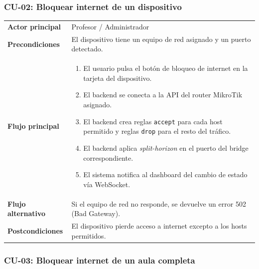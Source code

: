 \documentclass[12pt, a4paper, twoside]{article}
\begin{document}
\subsubsection{CU-02: Bloquear internet de un dispositivo}

\begin{tabularx}{\textwidth}{lX}
  \toprule
  \textbf{Actor principal} & Profesor / Administrador \\
  \textbf{Precondiciones}  & El dispositivo tiene un equipo de red asignado y un puerto detectado. \\
  \textbf{Flujo principal}  &
  \begin{enumerate}[nosep]
    \item El usuario pulsa el botón de bloqueo de internet en la tarjeta del dispositivo.
    \item El backend se conecta a la API del router MikroTik asignado.
    \item El backend crea reglas \texttt{accept} para cada host permitido y reglas \texttt{drop} para el resto del tráfico.
    \item El backend aplica \textit{split-horizon} en el puerto del bridge correspondiente.
    \item El sistema notifica al dashboard del cambio de estado vía WebSocket.
  \end{enumerate} \\
  \textbf{Flujo alternativo} & Si el equipo de red no responde, se devuelve un error 502 (Bad Gateway). \\
  \textbf{Postcondiciones} & El dispositivo pierde acceso a internet excepto a los hosts permitidos. \\
  \bottomrule
\end{tabularx}

\subsubsection{CU-03: Bloquear internet de un aula completa}
\end{document}
